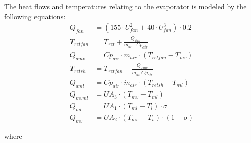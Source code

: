 The heat flows and temperatures relating to the evaporator is modeled by the following equations:
\begin{align}
	Q_{fan} 		& = (155 \cdot U_{fan}^2 + 40 \cdot U_{fan}^3) \cdot 0.2 \\
	T_{retfan} 		& = T_{ret} + \frac{Q_{fan}}{\dot{m}_{air} \cdot Cp_{air}} \\
	Q_{amv} 		& = Cp_{air} \cdot \dot{m}_{air} \cdot (T_{retfan} - T_{mv}) \\
	T_{retsh} 		& = T_{retfan} - \frac{Q_{amv}}{\dot{m}_{air} \dot Cp_{air}} \\
	Q_{aml} 		& = Cp_{air} \cdot \dot{m}_{air} \cdot (T_{retsh} - T_{ml}) \\
	Q_{mvml} 		& = U A_3 \cdot (T_{mv} - T_{ml}) \\
	Q_{ml} 			& = U A_1 \cdot (T_{ml} - T_l) \cdot \sigma\\
	Q_{mv} 			& = U A_2 \cdot (T_{mv} - T_v) \cdot (1- \sigma)
\end{align}

where

